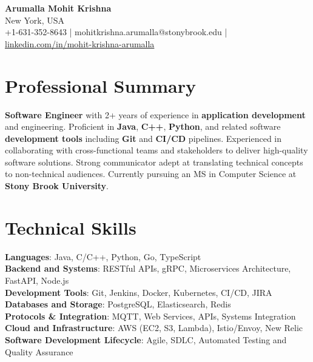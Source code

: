 \documentclass[letterpaper,11pt]{article}
\begin{document}
\begin{center}
  {\Large \textbf{Arumalla Mohit Krishna}} \\
  New York, USA \\
  +1-631-352-8643 \enspace | \enspace mohitkrishna.arumalla@stonybrook.edu \enspace | \enspace \href{https://www.linkedin.com/in/mohit-krishna-arumalla}{linkedin.com/in/mohit-krishna-arumalla}
\end{center}

\section{Professional Summary}
  \begin{itemize}[leftmargin=0.15in, label={}]
    \small{\item{
     \textbf{Software Engineer} with 2+ years of experience in \textbf{application development} and engineering. Proficient in \textbf{Java}, \textbf{C++}, \textbf{Python}, and related software \textbf{development tools} including \textbf{Git} and \textbf{CI/CD} pipelines. Experienced in collaborating with cross-functional teams and stakeholders to deliver high-quality software solutions. Strong communicator adept at translating technical concepts to non-technical audiences. Currently pursuing an MS in Computer Science at \textbf{Stony Brook University}.
    }}
  \end{itemize}
\vspace{-16pt}

\section{Technical Skills}
 \begin{itemize}[leftmargin=0.15in, label={}]
    \small{\item{
     \textbf{Languages}: Java, C/C++, Python, Go, TypeScript \\
     \textbf{Backend and Systems}: RESTful APIs, gRPC, Microservices Architecture, FastAPI, Node.js \\
     \textbf{Development Tools}: Git, Jenkins, Docker, Kubernetes, CI/CD, JIRA \\
     \textbf{Databases and Storage}: PostgreSQL, Elasticsearch, Redis \\
     \textbf{Protocols \& Integration}: MQTT, Web Services, APIs, Systems Integration \\
     \textbf{Cloud and Infrastructure}: AWS (EC2, S3, Lambda), Istio/Envoy, New Relic \\
     \textbf{Software Development Lifecycle}: Agile, SDLC, Automated Testing and Quality Assurance  
    }}
 \end{itemize}
\vspace{-16pt}
\end{document}
